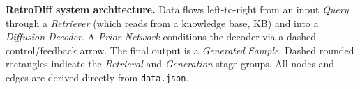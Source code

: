 \caption{\textbf{RetroDiff system architecture.} Data flows left-to-right from an input \emph{Query} through a \emph{Retriever} (which reads from a knowledge base, KB) and into a \emph{Diffusion Decoder}. A \emph{Prior Network} conditions the decoder via a dashed control/feedback arrow. The final output is a \emph{Generated Sample}. Dashed rounded rectangles indicate the \emph{Retrieval} and \emph{Generation} stage groups. All nodes and edges are derived directly from \texttt{data.json}.}
